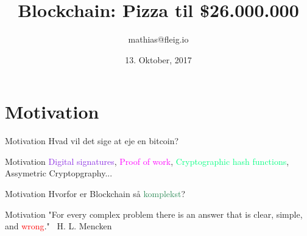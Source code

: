 \documentclass[usenames, dvipsnames]{beamer}
\title{Blockchain: Pizza til \hsout{\$21.000.000} \$26.000.000}
\date{13. Oktober, 2017}
\author{mathias@fleig.io}
\institute{Datalogisk Institut \\ Københavns Universitet}
\begin{document}
  \maketitle
  \section{Motivation}
  \begin{frame}{Motivation}
    \center Hvad vil det sige at \textcolor{BurntOrange}{eje} en bitcoin?
  \end{frame}
  \begin{frame}{Motivation}
      \center \textcolor{BlueViolet}{Digital signatures}, \textcolor{Magenta}{Proof of work}, \center \textcolor{SpringGreen}{Cryptographic hash functions}, \textcolor{Emerald}{Assymetric Cryptopgraphy}...
  \end{frame}
  \begin{frame}{Motivation}
    \center Hvorfor er Blockchain så \textcolor{SeaGreen}{komplekst}?
  \end{frame}
  \begin{frame}{Motivation}
      \center "For every complex problem there is an answer that is clear,
			   simple, and \textcolor{red}{wrong}." \textemdash \ H. L. Mencken
  \end{frame}
\end{document}
